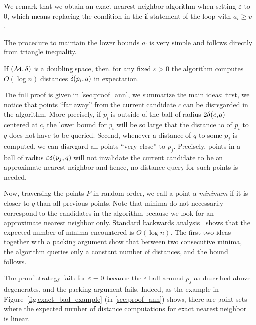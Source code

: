 \documentclass[]{ws-ijcga}
\renewcommand{\geq}{\geqslant}
\newcommand{\eps}{\varepsilon}
\begin{document}
We remark that we obtain an exact nearest neighbor algorithm
when setting $\eps$ to $0$, which means 
replacing the condition in the if-statement of the loop
with $a_i\geq v$.

The procedure to maintain the lower bounds $a_i$
is very simple and follows directly
from triangle inequality.

\begin{algorithmic}
    \EndFor
\EndProcedure
\end{algorithmic}

\begin{theorem}
\label{thm:ann_bound}
    If $(\mathcal{M}, \delta)$ is a doubling space, then, for any fixed $\eps > 0$ the
    algorithm computes $O(\log n)$ distances $\delta(p_i, q)$ in expectation.
\end{theorem}

The full proof is given in \ref{sec:proof_ann},
we summarize the main ideas:
first, we notice that points ``far away'' from the current candidate $c$ 
can be disregarded in the algorithm. More precisely, if $p_i$
is outside of the ball of radius $2\delta(c, q)$ centered at $c$,
the lower bound for $p_i$ will be so large that
the distance to of $p_i$ to $q$ does not have to be queried.
Second, whenever a distance of $q$ to some $p_j$ is computed,
we can disregard all points ``very close'' to $p_j$.
Precisely, points in a ball of radius $\eps\dist(p_j,q)$
will not invalidate the current candidate 
to be an approximate nearest neighbor and hence,
no distance query for such points is needed.

Now, traversing the points $P$ in random order,
we call a point a \emph{minimum} if it is closer to $q$
than all previous points. Note that minima do not necessarily
correspond to the candidates in the algorithm because
we look for an approximate nearest neighbor only.
Standard backwards analysis~\cite{seidel-backwards}
shows that the expected number of minima encountered is $O(\log n)$.
The first two ideas together with a packing argument show
that between two consecutive minima, 
the algorithm queries only a constant number of distances,
and the bound follows.

The proof strategy fails for $\eps=0$ because the $\eps$-ball
around $p_j$ as described above degenerates, and the packing argument fails.
Indeed, as the example in Figure~\ref{fig:exact_bad_example} (in \ref{sec:proof_ann}) 
shows, there are point sets where the expected number
of distance computations for exact nearest neighbor is linear.
\end{document}
